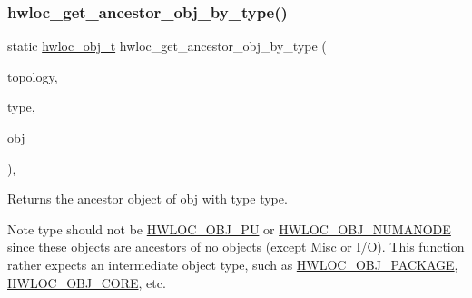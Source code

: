 \subsubsection{\texorpdfstring{hwloc\+\_\+get\+\_\+ancestor\+\_\+obj\+\_\+by\+\_\+type()}{hwloc\_get\_ancestor\_obj\_by\_type()}}
{\footnotesize\ttfamily static \hyperlink{a00185_ga79b8ab56877ef99ac59b833203391c7d}{hwloc\+\_\+obj\+\_\+t} hwloc\+\_\+get\+\_\+ancestor\+\_\+obj\+\_\+by\+\_\+type (\begin{DoxyParamCaption}\item[{\hyperlink{a00186_ga9d1e76ee15a7dee158b786c30b6a6e38}{hwloc\+\_\+topology\+\_\+t}}]{topology,  }\item[{\hyperlink{a00184_gacd37bb612667dc437d66bfb175a8dc55}{hwloc\+\_\+obj\+\_\+type\+\_\+t}}]{type,  }\item[{\hyperlink{a00185_ga79b8ab56877ef99ac59b833203391c7d}{hwloc\+\_\+obj\+\_\+t}}]{obj }\end{DoxyParamCaption})\hspace{0.3cm}{\ttfamily [inline]}, {\ttfamily [static]}}



Returns the ancestor object of {\ttfamily obj} with type {\ttfamily type}. 

\begin{DoxyNote}{Note}
{\ttfamily type} should not be \hyperlink{a00184_ggacd37bb612667dc437d66bfb175a8dc55abca6887e80cb291353b0a0c1da83f661}{H\+W\+L\+O\+C\+\_\+\+O\+B\+J\+\_\+\+PU} or \hyperlink{a00184_ggacd37bb612667dc437d66bfb175a8dc55a9d917a3e5497950c6d8948b8e183db5a}{H\+W\+L\+O\+C\+\_\+\+O\+B\+J\+\_\+\+N\+U\+M\+A\+N\+O\+DE} since these objects are ancestors of no objects (except Misc or I/O). This function rather expects an intermediate object type, such as \hyperlink{a00184_ggacd37bb612667dc437d66bfb175a8dc55ab16ab8c0dbffc234921d86f3dfb63129}{H\+W\+L\+O\+C\+\_\+\+O\+B\+J\+\_\+\+P\+A\+C\+K\+A\+GE}, \hyperlink{a00184_ggacd37bb612667dc437d66bfb175a8dc55ac793958f330bca371aa1535de8aff45f}{H\+W\+L\+O\+C\+\_\+\+O\+B\+J\+\_\+\+C\+O\+RE}, etc. 
\end{DoxyNote}
\mbox{\label{a00197_gab1fa883021928b5c476911c4102e9be3}} 
